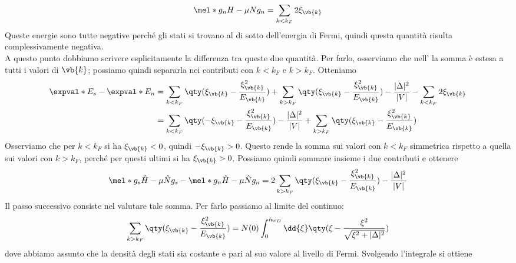 \begin{equation*}
   \mel*{g_n}{H - \mu N}{g_n}
   =\sum_{k < k_F} 2\xi_{\vb{k}}
\end{equation*}
Queste energie sono tutte negative perché gli stati si trovano al di sotto dell'energia di Fermi, quindi questa quantità risulta complessivamente negativa.\\
A questo punto dobbiamo scrivere esplicitamente la differenza tra queste due quantità. Per farlo, osserviamo che nell' la somma è estesa a tutti i valori di $\vb{k}$; possiamo quindi separarla nei contributi con $k<k_F$ e $k>k_F$. Otteniamo
\begin{equation*}
   \begin{split}
      \expval*{E}_s - \expval*{E}_n
      & =
      \sum_{k<k_F}
      \qty(
      \xi_{\vb{k}}
      -
      \frac{\xi^2_{\vb{k}}}{E_{\vb{k}}}
      )
      + \sum_{k > k_F} \qty( \xi_{\vb{k}} - \frac{\xi^2_{\vb{k}}}{E_{\vb{k}}} )
      - \frac{|\Delta|^2}{|V|}
      - \sum_{k < k_F} 2\xi_{\vb{k}}
      \\
      & =
      \sum_{k<k_F} \qty( -\xi_{\vb{k}} - \frac{\xi^2_{\vb{k}}}{E_{\vb{k}}} )
      -\frac{|\Delta|^2}{|V|}
      + \sum_{k > k_F} \qty( \xi_{\vb{k}} - \frac{\xi^2_{\vb{k}}}{E_{\vb{k}}} )
   \end{split}
\end{equation*}
Osserviamo che per $k<k_F$ si ha $\xi_{\vb{k}}<0$, quindi $-\xi_{\vb{k}}>0$. Questo rende la somma sui valori con $k<k_F$ simmetrica rispetto a quella sui valori con $k>k_F$, perché per questi ultimi si ha $\xi_{\vb{k}}>0$. Possiamo quindi sommare insieme i due contributi e ottenere
\begin{equation*}
   \mel*{g_s}{\hat{H} - \mu \hat{N}}{g_s}
   -
   \mel*{g_n}{\hat{H} - \mu \hat{N}}{g_n}
   =
   2 \sum_{k > k_F}
   \qty(
   \xi_{\vb{k}}
   -
   \frac{\xi^2_{\vb{k}}}{E_{\vb{k}}}
   )
   -
   \frac{|\Delta|^2}{|V|}
\end{equation*}
Il passo successivo consiste nel valutare tale somma. Per farlo passiamo al limite del continuo:
\begin{equation*}
   \sum_{k > k_F} \qty( \xi_{\vb{k}} - \frac{\xi^2_{\vb{k}}}{E_{\vb{k}}} )
   =N(0) \int_{0}^{\hbar \omega_D} \dd{\xi} \qty( \xi - \frac{\xi^2}{\sqrt{\xi^2 + |\Delta|^2}} )
\end{equation*}
dove abbiamo assunto che la densità degli stati sia costante e pari al suo valore al livello di Fermi. Svolgendo l'integrale si ottiene
